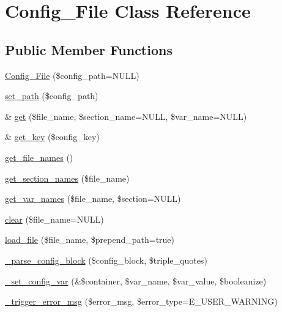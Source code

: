 \hypertarget{class_config___file}{\section{\-Config\-\_\-\-File \-Class \-Reference}
\label{class_config___file}
}
\subsection*{\-Public \-Member \-Functions}
\begin{DoxyCompactItemize}
\item 
\hyperlink{class_config___file_aca7833d633dfdb20287c9596e386790d}{\-Config\-\_\-\-File} (\$config\-\_\-path=\-N\-U\-L\-L)
\item 
\hyperlink{class_config___file_afd02d9b052d474f69b9b0040c33b47bc}{set\-\_\-path} (\$config\-\_\-path)
\item 
\& \hyperlink{class_config___file_ad05ce02f9812f6890276b98277bf372f}{get} (\$file\-\_\-name, \$section\-\_\-name=\-N\-U\-L\-L, \$var\-\_\-name=\-N\-U\-L\-L)
\item 
\& \hyperlink{class_config___file_ac922d3e712db53b74e8fa1b70dc85ab1}{get\-\_\-key} (\$config\-\_\-key)
\item 
\hyperlink{class_config___file_a1ddcf0e43f022559bf8e8ecfaf98a1bc}{get\-\_\-file\-\_\-names} ()
\item 
\hyperlink{class_config___file_a87a9f1ba0feaebb36833ffba7af5b398}{get\-\_\-section\-\_\-names} (\$file\-\_\-name)
\item 
\hyperlink{class_config___file_a1cc9733d0fbe7253d814110ee83ba385}{get\-\_\-var\-\_\-names} (\$file\-\_\-name, \$section=\-N\-U\-L\-L)
\item 
\hyperlink{class_config___file_ad5c7a23104aa4e60e5206d45f12b213f}{clear} (\$file\-\_\-name=\-N\-U\-L\-L)
\item 
\hyperlink{class_config___file_a60cecc7ed22569ca42611cecec809c7d}{load\-\_\-file} (\$file\-\_\-name, \$prepend\-\_\-path=true)
\item 
\hyperlink{class_config___file_a852f469d57f9261239eec6e3076bf59e}{\-\_\-parse\-\_\-config\-\_\-block} (\$config\-\_\-block, \$triple\-\_\-quotes)
\item 
\hyperlink{class_config___file_a395dfc55bb2ce7e6126e453e7d7c3c59}{\-\_\-set\-\_\-config\-\_\-var} (\&\$container, \$var\-\_\-name, \$var\-\_\-value, \$booleanize)
\item 
\hyperlink{class_config___file_ac875b1d5870a59fda17bbdb25c792b17}{\-\_\-trigger\-\_\-error\-\_\-msg} (\$error\-\_\-msg, \$error\-\_\-type=\-E\-\_\-\-U\-S\-E\-R\-\_\-\-W\-A\-R\-N\-I\-N\-G)
\end{DoxyCompactItemize}

